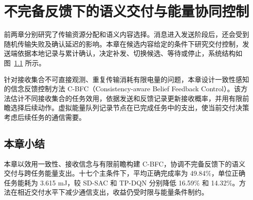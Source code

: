 \chapter{不完备反馈下的语义交付与能量协同控制}
\label{rq3:chapter}

前两章分别研究了传输资源分配和语义内容选择。消息进入发送阶段后，还会受到随机传输失败及确认延迟的影响。本章在候选内容给定的条件下研究交付控制，发送端依据本地记录与累计确认，决定补发、切换候选、等待或停止，系统结构如图~\ref{rq3:fig:system} 所示。

\begin{figure}[htbp]
\centering

\label{rq3:fig:system}
\end{figure}

针对接收集合不可直接观测、重复传输消耗有限电量的问题，本章设计一致性感知的信念反馈控制方法 C-BFC（Consistency-aware Belief Feedback Control）。该方法估计不同接收集合的任务效用，依据发送和反馈记录更新接收概率，并用有限前瞻选择后续动作。虚拟能量队列记录节点在已完成任务中的支出，使当前交付决策考虑后续任务的通信需要。





\section{本章小结}
\label{rq3:subsec:discussion}

本章以效用一致性、接收信念与有限前瞻构建 C-BFC，协调不完备反馈下的语义交付与跨任务能量支出。十七个主条件下，平均正确完成率为 49.84\%，单位正确任务能耗为 3.615 mJ，较 SD-SAC 和 TP-DQN 分别降低 16.59\% 和 14.32\%。方法在相近交付水平下减少通信支出，收益仍受时限与能量条件制约。
